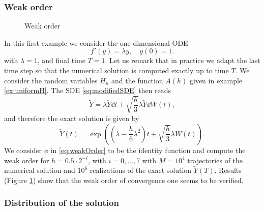 \documentclass{scrartcl}
\begin{document}
\subsubsection{Weak order}
\begin{figure}[t]
	\centering
	\resizebox{0.6\linewidth}{!}{}
	\caption{Weak order}
	\label{fig:WeakOrder}
\end{figure}
In this first example we consider the one-dimensional ODE
\begin{equation}
	f'(y) = \lambda y, \quad y(0) = 1. 
\end{equation}
with $\lambda = 1$, and final time $T = 1$. Let us remark that in practice we adapt the last time step so that the numerical solution is computed exactly up to time $T$. We consider the random variables $H_n$ and the function $A(h)$ given in example \ref{ex:uniformH}. The SDE \eqref{eq:modifiedSDE} then reads
\begin{equation}
	\tilde Y = \lambda \tilde Y \dd t + \sqrt{\frac{h}{3}} \lambda \tilde Y \dd W(t),
\end{equation}
and therefore the exact solution is given by
\begin{equation}
	\tilde Y(t) = \exp(\left(\lambda - \frac{h}{6}\lambda^2\right)t + \sqrt{\frac{h}{3}}\lambda W(t)).
\end{equation}
We consider $\phi$ in \eqref{eq:weakOrder} to be the identity function and compute the weak order for $h = 0.5 \cdot 2^{-i}$, with $i = 0, \ldots, 7$ with $M = 10^4$ trajectories of the numerical solution and $10^6$ realizations of the exact solution $\tilde Y(T)$. Results (Figure \ref{fig:WeakOrder}) show that the weak order of convergence one seems to be verified.

\subsubsection{Distribution of the solution}
\end{document}
